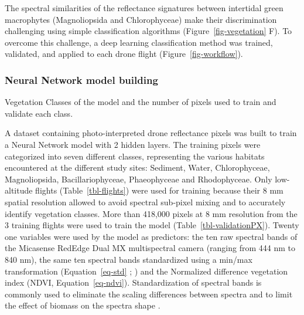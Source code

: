 \documentclass[
  number]{elsarticle}
\begin{document}
The spectral similarities of the reflectance signatures between
intertidal green macrophytes (Magnoliopsida and Chlorophyceae) make
their discrimination challenging using simple classification algorithms
(Figure~\ref{fig-vegetation} F). To overcome this challenge, a deep
learning classification method was trained, validated, and applied to
each drone flight (Figure~\ref{fig-workflow}).

\subsubsection{Neural Network model
building}\label{neural-network-model-building}

\begin{table}

\caption{\label{tbl-validationPX}Vegetation Classes of the model and the
number of pixels used to train and validate each class.}


\end{table}%

A dataset containing photo-interpreted drone reflectance pixels was
built to train a Neural Network model with 2 hidden layers. The training
pixels were categorized into seven different classes, representing the
various habitats encountered at the different study sites: Sediment,
Water, Chlorophyceae, Magnoliopsida, Bacillariophyceae, Phaeophyceae and
Rhodophyceae. Only low-altitude flights (Table~\ref{tbl-flights}) were
used for training because their 8 mm spatial resolution allowed to avoid
spectral sub-pixel mixing and to accurately identify vegetation classes.
More than 418,000 pixels at 8 mm resolution from the 3 training flights
were used to train the model (Table~\ref{tbl-validationPX}). Twenty one
variables were used by the model as predictors: the ten raw spectral
bands of the Micasense RedEdge Dual MX multispectral camera (ranging
from 444 nm to 840 nm), the same ten spectral bands standardized using a
min/max transformation (Equation~\ref{eq-std} ; \citep{Cao2017}) and the
Normalized difference vegetation index (NDVI, Equation~\ref{eq-ndvi}).
Standardization of spectral bands is commonly used to eliminate the
scaling differences between spectra and to limit the effect of biomass
on the spectra shape \citetext{\citealp[
]{Douay2022}; \citealp{Davies2023}}.
\end{document}
